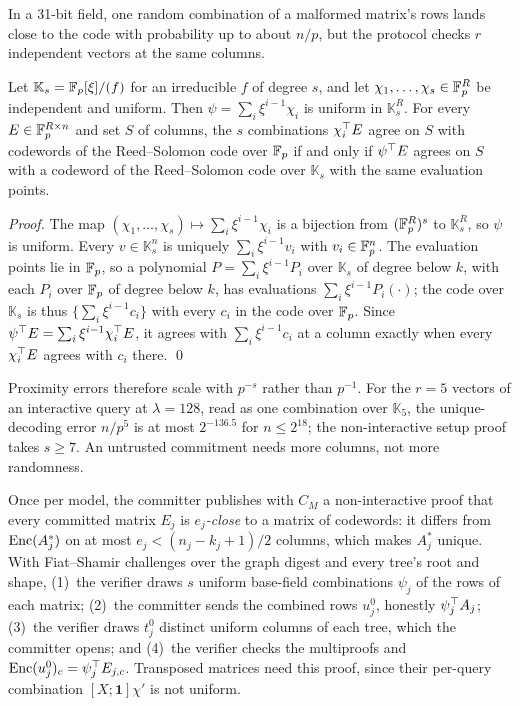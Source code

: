  In a 31-bit field, one random combination of a
malformed matrix's rows lands close to the code with probability up to about $n/p$, but the protocol
checks $r$ independent vectors at the same columns.

\begin{fact}
\label{fact:ext}
Let $\mathbb K_s=\mathbb{F}_p[\xi]/(f)$ for an irreducible $f$ of degree $s$, and let $\chi_1,\dots,\chi_s\in\mathbb{F}_p^R$
be independent and uniform. Then $\psi=\sum_i\xi^{i-1}\chi_i$ is uniform in $\mathbb K_s^R$. For every
$E\in\mathbb{F}_p^{R\times n}$ and set $S$ of columns, the $s$ combinations $\chi_i^\top E$ agree on $S$ with
codewords of the Reed--Solomon code over $\mathbb{F}_p$ if and only if $\psi^\top E$ agrees on $S$ with a
codeword of the Reed--Solomon code over $\mathbb K_s$ with the same evaluation points.
\end{fact}

\noindent\emph{Proof.} The map $(\chi_1,\dots,\chi_s)\mapsto\sum_i\xi^{i-1}\chi_i$ is a bijection from
$(\mathbb{F}_p^R)^s$ to $\mathbb K_s^R$, so $\psi$ is uniform. Every $v\in\mathbb K_s^n$ is uniquely
$\sum_i\xi^{i-1}v_i$ with $v_i\in\mathbb{F}_p^n$. The evaluation points lie in $\mathbb{F}_p$, so a polynomial
$P=\sum_i\xi^{i-1}P_i$ over $\mathbb K_s$ of degree below $k$, with each $P_i$ over $\mathbb{F}_p$ of degree below
$k$, has evaluations $\sum_i\xi^{i-1}P_i(\cdot)$; the code over $\mathbb K_s$ is thus
$\{\sum_i\xi^{i-1}c_i\}$ with every $c_i$ in the code over $\mathbb{F}_p$. Since
$\psi^\top E=\sum_i\xi^{i-1}\chi_i^\top E$, it agrees with $\sum_i\xi^{i-1}c_i$ at a column exactly when
every $\chi_i^\top E$ agrees with $c_i$ there. \qed

\smallskip
\noindent Proximity errors therefore scale with $p^{-s}$ rather than $p^{-1}$. For the $r=5$ vectors
of an interactive query at $\lambda=128$, read as one combination over $\mathbb K_5$, the
unique-decoding error $n/p^5$ is at most $2^{-136.5}$ for $n\le2^{18}$; the non-interactive setup
proof takes $s\ge7$. An untrusted commitment needs more columns, not more randomness.

 Once per model, the committer publishes with $C_M$ a non-interactive proof
that every committed matrix $E_j$ is \emph{$e_j$-close} to a matrix of codewords: it differs from
$\mathrm{Enc}(A^*_j)$ on at most $e_j<(n_j-k_j+1)/2$ columns, which makes $A^*_j$ unique. With Fiat--Shamir
challenges over the graph digest and every tree's root and shape, (1)~the verifier draws $s$ uniform
base-field combinations $\psi_j$ of the rows of each matrix; (2)~the committer sends the combined
rows $u^0_j$, honestly $\psi_j^\top A_j$; (3)~the verifier draws $t^0_j$ distinct uniform columns of
each tree, which the committer opens; and (4)~the verifier checks the multiproofs and
$\mathrm{Enc}(u^0_j)_c=\psi_j^\top E_{j,c}$. Transposed matrices
need this proof, since their per-query combination $[X;\mathbf 1]\chi'$ is not uniform.


